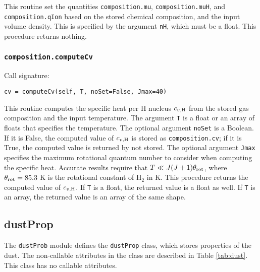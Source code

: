 \documentclass[12pt]{article}
\begin{document}
This routine set the quantities \verb=composition.mu=, \verb=composition.muH=, and \verb=composition.qIon= based on the stored chemical composition, and the input volume density. This is specified by the argument \verb=nH=, which must be a float. This procedure returns nothing.


\subsubsection{\texttt{composition.computeCv}}

Call signature:

\begin{verbatim}
cv = computeCv(self, T, noSet=False, Jmax=40)
\end{verbatim}

This routine computes the specific heat per H nucleus $c_{v,\rm H}$ from the stored gas composition and the input temperature. The argument \verb=T= is a float or an array of floats that specifies the temperature. The optional argument \verb=noSet= is a Boolean. If it is False, the computed value of $c_{v,\rm H}$ is stored as \verb=composition.cv=; if it is True, the computed value is returned by not stored. The optional argument \verb=Jmax= specifies the maximum rotational quantum number to consider when computing the specific heat. Accurate results require that $T \ll J(J+1) \theta_{\rm rot}$, where $\theta_{\rm rot} = 85.3$ K is the rotational constant of H$_2$ in K. This procedure returns the computed value of $c_{v,\rm H}$. If \verb=T= is a float, the returned value is a float as well. If \verb=T= is an array, the returned value is an array of the same shape.


\clearpage

\subsection{dustProp}

The \verb=dustProb= module defines the \verb=dustProp= class, which stores properties of the dust. The non-callable attributes in the class are described in Table \ref{tab:dust}. This class has no callable attributes.
\end{document}

